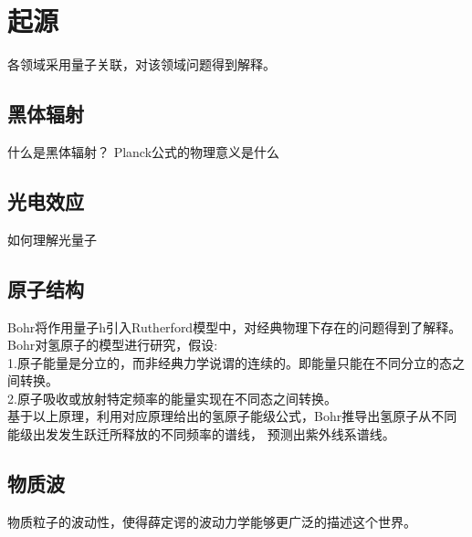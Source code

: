 
\newpage
\section{起源}
各领域采用量子关联，对该领域问题得到解释。
\subsection{黑体辐射}
什么是黑体辐射？
Planck公式的物理意义是什么

\subsection{光电效应}
如何理解光量子

\subsection{原子结构}
Bohr将作用量子h引入Rutherford模型中，对经典物理下存在的问题得到了解释。\\
Bohr对氢原子的模型进行研究，假设:\\
1.原子能量是分立的，而非经典力学说谓的连续的。即能量只能在不同分立的态之间转换。\\
2.原子吸收或放射特定频率的能量实现在不同态之间转换。\\
基于以上原理，利用对应原理给出的氢原子能级公式，Bohr推导出氢原子从不同能级出发发生跃迁所释放的不同频率的谱线，
预测出紫外线系谱线。

\subsection{物质波}
物质粒子的波动性，使得薛定谔的波动力学能够更广泛的描述这个世界。